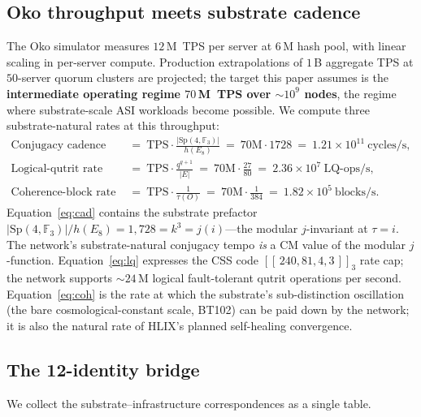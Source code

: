 \documentclass[11pt,letterpaper]{article}
\theoremstyle{remark}
\newcommand{\Sp}{\mathrm{Sp}}
\newcommand{\FF}{\mathbb{F}}
\newcommand{\TPS}{\mathrm{TPS}}
\begin{document}
\subsection{Oko throughput meets substrate cadence}
The Oko simulator measures $12$\,M~TPS per server at $6$\,M hash pool, with linear scaling
in per-server compute. Production extrapolations of $1$\,B aggregate TPS at $50$-server
quorum clusters are projected; the target this paper assumes is the \textbf{intermediate
operating regime $70$\,M~TPS over $\sim10^9$ nodes}, the regime where substrate-scale ASI
workloads become possible. We compute three substrate-natural rates at this throughput:
\begin{align}
\text{Conjugacy cadence}\quad &=\ \TPS\cdot\frac{|\Sp(4,\FF_3)|}{h(E_8)}\ =\ 70\text{M}\cdot 1728
\ =\ 1.21\times 10^{11}\ \text{cycles/s},\label{eq:cad}\\
\text{Logical-qutrit rate}\quad &=\ \TPS\cdot\frac{q^{q+1}}{|E|}\ =\ 70\text{M}\cdot\frac{27}{80}
\ =\ 2.36\times 10^7\ \text{LQ-ops/s},\label{eq:lq}\\
\text{Coherence-block rate}\quad &=\ \TPS\cdot\frac{1}{\tau(O)}\ =\ 70\text{M}\cdot\frac{1}{384}
\ =\ 1.82\times 10^5\ \text{blocks/s}.\label{eq:coh}
\end{align}
Equation~\eqref{eq:cad} contains the substrate prefactor $|\Sp(4,\FF_3)|/h(E_8)=1{,}728=k^3
=j(i)$---the modular $j$-invariant at $\tau=i$. The network's substrate-natural conjugacy
tempo \emph{is} a CM value of the modular $j$-function. Equation~\eqref{eq:lq} expresses the
CSS code $[[\,240,81,4,3\,]]_3$ rate cap; the network supports $\sim 24$\,M logical
fault-tolerant qutrit operations per second. Equation~\eqref{eq:coh} is the rate at which the
substrate's sub-distinction oscillation (the bare cosmological-constant scale, BT102) can
be paid down by the network; it is also the natural rate of HLIX's planned self-healing
convergence.

\subsection{The 12-identity bridge}
We collect the substrate--infrastructure correspondences as a single table.
\end{document}
